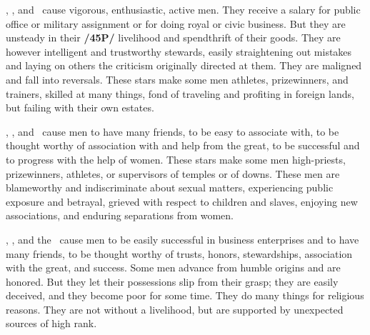\Jupiter, \Mars, and \Mercury\, cause vigorous, enthusiastic, active men. They receive a salary for public office or military assignment or for doing royal or civic business. But they are unsteady in their \textbf{/45P/} livelihood and spendthrift of their goods. They are however intelligent and trustworthy stewards, easily straightening out mistakes and laying on others the criticism originally directed at them. They are maligned and fall into reversals. These stars make some men athletes, prizewinners, and trainers, skilled at many things, fond of traveling and profiting in foreign lands, but failing with their own estates. 

\Jupiter, \Mars, and \Venus\, cause men to have many friends, to be easy to associate with, to be thought worthy of association with and help from the great, to be successful and to progress with the help of women. These stars make some men high-priests, prizewinners, athletes, or supervisors of temples or of downs. These men are blameworthy and indiscriminate about sexual matters, experiencing public exposure and betrayal, grieved with respect to children and slaves, enjoying new associations, and enduring separations from women.

\Jupiter, \Mercury, and the \Sun\, cause men to be easily successful in business enterprises and to have many friends, to be thought worthy of trusts, honors, stewardships, association with the great, and success. Some men advance from humble origins and are honored. But they let their possessions slip from their grasp; they are easily deceived, and they become poor for some time. They do many things for religious reasons. They are not without a livelihood, but are supported by unexpected sources of high rank.

